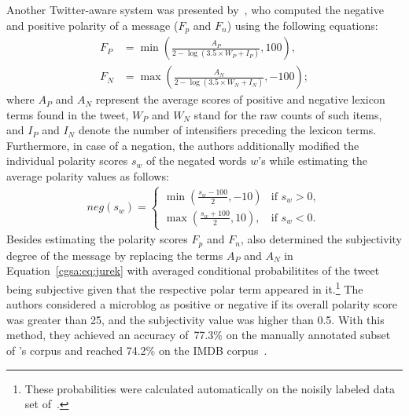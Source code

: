 Another Twitter-aware system was presented by~\citet{Jurek:15}, who
computed the negative and positive polarity of a message ($F_p$ and
$F_n$) using the following equations: { \small%
  \begin{align}
    F_P &= \min\left(\frac{A_P}{2 - \log(3.5\times W_P + I_P)}, 100\right),\\
    F_N &= \max\left(\frac{A_N}{2 - \log(3.5\times W_N + I_N)}, -100\right);\label{cgsa:eq:jurek}
  \end{align}%
  \normalsize%
}%
where $A_P$ and $A_N$ represent the average scores of positive and
negative lexicon terms found in the tweet, $W_P$ and $W_N$ stand for
the raw counts of such items, and $I_P$ and $I_N$ denote the number of
intensifiers preceding the lexicon terms.  Furthermore, in case of a
negation, the authors additionally modified the individual polarity
scores $s_w$ of the negated words $w$'s while estimating the average
polarity values as follows: { \small%
  \begin{align}
neg(s_w) =
    \begin{cases}
        \min\left(\frac{s_w - 100}{2}, -10\right) & \text{if } s_w > 0,\\
        \max\left(\frac{s_w + 100}{2}, 10\right), & \text{if } s_w < 0.
    \end{cases}
\end{align}%
\normalsize%
}%
Besides estimating the polarity scores $F_p$ and $F_n$,
\citeauthor{Jurek:15} also determined the subjectivity degree of the
message by replacing the terms $A_P$ and $A_N$ in
Equation~\ref{cgsa:eq:jurek} with averaged conditional probabilitites
of the tweet being subjective given that the respective polar term
appeared in it.\footnote{These probabilities were calculated
  automatically on the noisily labeled data set of~\citet{Go:09}.}
The authors considered a microblog as positive or negative if its
overall polarity score was greater than 25, and the subjectivity value
was higher than 0.5.  With this method, they achieved an accuracy
of~77.3\% on the manually annotated subset of \citeauthor{Go:09}'s
corpus and reached 74.2\% on the IMDB corpus~\cite{Maas:11}.

